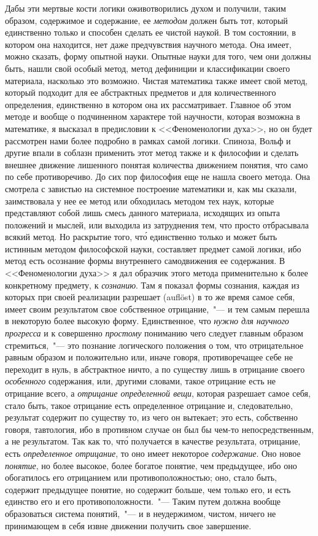 Дабы эти мертвые кости логики оживотворились духом
и получили, таким образом, содержимое и содержание,
ее \emph{методом} должен быть тот, который единственно
только и способен сделать ее чистой наукой. В том состоянии,
в котором она находится, нет даже предчувствия
научного метода. Она имеет, можно сказать, форму опытной
науки. Опытные науки для того, чем они должны
быть, нашли свой особый метод, метод дефиниции и классификации
своего материала, насколько это возможно. Чистая
математика также имеет свой метод, который подходит
для ее абстрактных предметов и для количественного
определения, единственно в котором она их рассматривает.
Главное об этом методе и вообще о подчиненном
характере той научности, которая возможна в математике,
я высказал в предисловии к <<Феноменологии духа>>,
но он будет рассмотрен нами более подробно в рамках
самой логики. Спиноза, Вольф и другие впали в соблазн
применить этот метод также и к философии и сделать
внешнее движение лишенного понятая количества движением
понятия, что само по себе противоречиво. До сих
пор философия еще не нашла своего метода. Она смотрела
с завистью на системное построение математики и,
как мы сказали, заимствовала у нее ее метод или обходилась
методом тех наук, которые представляют собой
лишь смесь данного материала, исходящих из опыта положений
и мыслей, или выходила из затруднения тем,
что просто отбрасывала всякий метод. Но раскрытие того,
чт\'о единственно только и может быть истинным методом
философской науки, составляет предмет самой логики,
ибо метод есть осознание формы внутреннего самодвижения
ее содержания. В <<Феноменологии духа>> я дал
образчик этого метода применительно к более конкретному
предмету, к \emph{сознанию}\footnotemark{}. Там я показал формы сознания,
каждая из которых при своей реализации разрешает
(auflöst) в то же время самое себя, имеет своим
результатом свое собственное отрицание,~"--- и тем самым
перешла в некоторую более высокую форму. Единственное,
что \emph{нужно для научного прогресса} и к совершенно
\emph{простому} пониманию чего следует главным образом стремиться,~"---
это познание логического положения о том, что
отрицательное равным образом и положительно или,
иначе говоря, противоречащее себе не переходит в нуль,
в абстрактное ничто, а по существу лишь в отрицание
своего \emph{особенного} содержания, или, другими словами,
такое отрицание есть не отрицание всего, а \emph{отрицание
определенной вещи}, которая разрешает самое себя, стало
быть, такое отрицание есть определенное отрицание и,
следовательно, результат содержит по существу то, из
чего он вытекает; это есть, собственно говоря, тавтология,
ибо в противном случае он был бы чем-то непосредственным,
а не результатом. Так как то, чт\'о получается
в качестве результата, отрицание, есть \emph{определенное отрицание},
то оно имеет некоторое \emph{содержание}. Оно новое
\emph{понятие}, но более высокое, более богатое понятие, чем
предыдущее, ибо оно обогатилось его отрицанием или противоположностью;
оно, стало быть, содержит предыдущее
понятие, но содержит больше, чем только его, и есть
единство его и его противоположности.~"--- Таким путем
должна вообще образоваться система понятий,~"--- и в неудержимом,
чистом, ничего не принимающем в себя
извне движении получить свое завершение.

